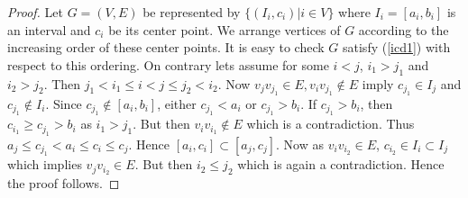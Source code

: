 \documentclass{article}
\theoremstyle{definition}
\numberwithin{equation}{section}
\begin{document}
\begin{proof}
Let $G=(V,E)$ be represented by $\{(I_{i},c_{i})|i\in V\}$ where $I_{i}=[a_{i},b_{i}]$ is an interval and $c_{i}$ be its center point. We arrange vertices of $G$ according to the increasing order of these center points. It is easy to check $G$ satisfy (\ref{icd1}) with respect to this ordering. On contrary lets assume for some $i<j$, $i_{1}>j_{1}$ and $i_{2}>j_{2}$. Then $j_1<i_1\leqslant i<j\leqslant j_2<i_2$. Now $v_{j}v_{j_{1}}\in E, v_{i}v_{j_{1}}\notin E$ imply $c_{j_1}\in I_j$ and $c_{j_1}\notin I_i$. Since $c_{j_1}\notin [a_i,b_i]$, either $c_{j_1}<a_i$ or $c_{j_1}>b_i$. If $c_{j_1}>b_i$, then $c_{i_1}\geq c_{j_1}>b_i$ as $i_1>j_1$. But then $v_iv_{i_1}\notin E$ which is a contradiction. Thus 
$a_{j}\leq c_{j_{1}}<a_{i}\leq c_{i}\leq c_{j}$. Hence $[a_{i},c_{i}]\subset [a_{j},c_{j}]$. Now as $v_{i}v_{i_{2}}\in E$, $c_{i_{2}}\in I_{i}\subset I_j$ which implies $v_{j}v_{i_{2}}\in E$. But then $i_2\leq j_2$ which is again a contradiction. Hence the proof follows.
\end{proof}
\end{document}
